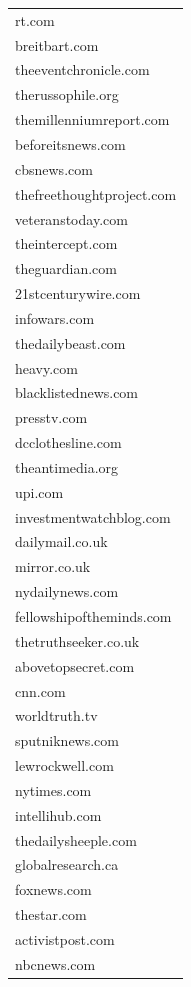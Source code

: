 \documentclass[12pt]{article}
\begin{document}
\begin{center}
\begin{longtable}{|l|}
\hline \hline
\endlastfoot
rt.com                    \\
breitbart.com             \\
theeventchronicle.com     \\
therussophile.org         \\
themillenniumreport.com   \\
beforeitsnews.com         \\
cbsnews.com               \\
thefreethoughtproject.com \\
veteranstoday.com         \\
theintercept.com          \\
theguardian.com           \\
21stcenturywire.com       \\
infowars.com              \\
thedailybeast.com         \\
heavy.com                 \\
blacklistednews.com       \\
presstv.com               \\
dcclothesline.com         \\
theantimedia.org          \\
upi.com                   \\
investmentwatchblog.com   \\
dailymail.co.uk           \\
mirror.co.uk              \\
nydailynews.com           \\
fellowshipoftheminds.com  \\
thetruthseeker.co.uk      \\
abovetopsecret.com        \\
cnn.com                   \\
worldtruth.tv             \\
sputniknews.com           \\
lewrockwell.com           \\
nytimes.com               \\
intellihub.com            \\
thedailysheeple.com       \\
globalresearch.ca         \\
foxnews.com               \\
thestar.com               \\
activistpost.com          \\
nbcnews.com  
\end{longtable}
\end{center}
\end{document}

